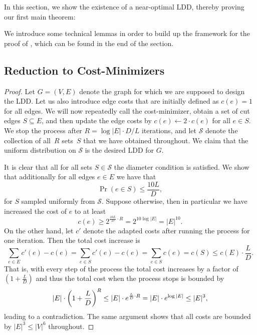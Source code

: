 \documentclass[letterpaper,11pt]{article}
\begin{document}
In this section, we show the existence of a near-optimal LDD, thereby proving our first main theorem: 

\thmMainExistential*

We introduce some technical lemmas in order to build up the framework for the proof of , which can be found in the end of the section.


\subsection{Reduction to Cost-Minimizers}

\mwu*

\begin{proof}
	Let $G = (V, E)$ denote the graph for which we are supposed to design the LDD. Let us also introduce edge costs that are initially defined as $c(e) = 1$ for all edges. We will now repeatedly call the cost-minimizer, obtain a set of cut edges $S \subseteq E$, and then update the edge costs by $c(e) \gets 2 \cdot c(e)$ for all $e \in S$. We stop the process after $R = \log |E| \cdot D/L$ iterations, and let $\mathcal S$ denote the collection of all~$R$ sets~$S$ that we have obtained throughout. We claim that the uniform distribution on $\mathcal S$ is the desired LDD for $G$.
	
	It is clear that all for all sets $S \in \mathcal S$ the diameter condition is satisfied. We show that additionally for all edges $e \in E$ we have that
	\begin{equation*}
		\Pr(e \in S) \leq \frac{10L}{D},
	\end{equation*}
	for $S$ sampled uniformly from $\mathcal S$. Suppose otherwise, then in particular we have increased the cost of $e$ to at least
	\begin{equation*}
		c(e) \geq 2^{\frac{10L}{D} \cdot R} = 2^{10 \log |E|} = |E|^{10}.
	\end{equation*}
	On the other hand, let $c'$ denote the adapted costs after running the process for one iteration. Then the total cost increase is
	\begin{equation*}
		\sum_{e \in E} c'(e) - c(e) = \sum_{e \in S} c'(e) - c(e) = \sum_{e \in S} c(e) = c(S) \leq c(E) \cdot \frac{L}{D}.
	\end{equation*}
	That is, with every step of the process the total cost increases by a factor of $(1 + \frac{L}{D})$ and thus the total cost when the process stops is bounded by
	\begin{equation*}
		|E| \cdot \parens*{1 + \frac{L}{D}}^R \leq |E| \cdot e^{\frac{L}{D} \cdot R} = |E| \cdot e^{\log |E|} \leq |E|^3,
	\end{equation*}
	leading to a contradiction. The same argument shows that all costs are bounded by $|E|^3 \leq |V|^6$ throughout.
\end{proof}
\end{document}

